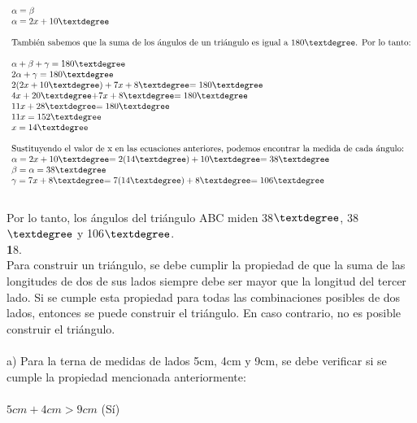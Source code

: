 \documentclass{article}
\begin{document}
\begin{equation}
\begin{array}{l}
\alpha = \beta\\
\alpha = 2x + 10$\textdegree$\\
\\
\text{También sabemos que la suma de los ángulos de un triángulo es igual a 180\textdegree. Por lo tanto:}\\
\\
\alpha + \beta + \gamma = 180\textdegree\\
2\alpha + \gamma = 180$\textdegree$\\
2(2x + 10$\textdegree$) + 7x + 8$\textdegree$ = 180$\textdegree$\\
4x + 20$\textdegree$ + 7x + 8$\textdegree$ = 180$\textdegree$\\
11x + 28$\textdegree$ = 180$\textdegree$\\
11x = 152$\textdegree$\\
x = 14$\textdegree$\\
\\
\text{Sustituyendo el valor de x en las ecuaciones anteriores, podemos encontrar la medida de cada ángulo:}
\\
\alpha = 2x + 10$\textdegree$ = 2(14$\textdegree$) + 10$\textdegree$ = 38$\textdegree$\\
\beta = \alpha = 38$\textdegree$\\
\gamma = 7x + 8$\textdegree$ = 7(14$\textdegree$) + 8$\textdegree$ = 106$\textdegree$\\
\end{array}
\end{equation}
\\
Por lo tanto, los ángulos del triángulo ABC miden 38$\textdegree$, 38$\textdegree$ y 106$\textdegree$.\\
{\textbf 18. }\\
Para construir un triángulo, se debe cumplir la propiedad de que la suma de las longitudes de dos de sus lados siempre debe ser mayor que la longitud del tercer lado. Si se cumple esta propiedad para todas las combinaciones posibles de dos lados, entonces se puede construir el triángulo. En caso contrario, no es posible construir el triángulo.\\
\\
a) Para la terna de medidas de lados 5cm, 4cm y 9cm, se debe verificar si se cumple la propiedad mencionada anteriormente:\\
\\
$5cm + 4cm > 9cm$ (Sí)\\
\end{document}
